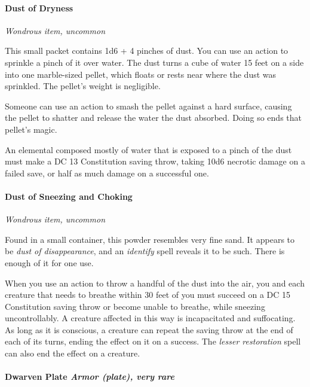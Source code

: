 \documentclass[
]{article}
\begin{document}
\hypertarget{dust-of-dryness}{%
\paragraph{Dust of Dryness}\label{dust-of-dryness}}

\emph{Wondrous item, uncommon}

This small packet contains 1d6 + 4 pinches of dust. You can use an
action to sprinkle a pinch of it over water. The dust turns a cube of
water 15 feet on a side into one marble-sized pellet, which floats or
rests near where the dust was sprinkled. The pellet's weight is
negligible.

Someone can use an action to smash the pellet against a hard surface,
causing the pellet to shatter and release the water the dust absorbed.
Doing so ends that pellet's magic.

An elemental composed mostly of water that is exposed to a pinch of the
dust must make a DC 13 Constitution saving throw, taking 10d6 necrotic
damage on a failed save, or half as much damage on a successful one.

\hypertarget{dust-of-sneezing-and-choking}{%
\paragraph{Dust of Sneezing and
Choking}\label{dust-of-sneezing-and-choking}}

\emph{Wondrous item, uncommon}

Found in a small container, this powder resembles very fine sand. It
appears to be \emph{dust of disappearance}, and an \emph{identify} spell
reveals it to be such. There is enough of it for one use.

When you use an action to throw a handful of the dust into the air, you
and each creature that needs to breathe within 30 feet of you must
succeed on a DC 15 Constitution saving throw or become unable to
breathe, while sneezing uncontrollably. A creature affected in this way
is incapacitated and suffocating. As long as it is conscious, a creature
can repeat the saving throw at the end of each of its turns, ending the
effect on it on a success. The \emph{lesser restoration} spell can also
end the effect on a creature.

\hypertarget{dwarven-plate-armor-plate-very-rare}{%
\paragraph{\texorpdfstring{Dwarven Plate \emph{Armor (plate), very
rare}}{Dwarven Plate Armor (plate), very rare}}\label{dwarven-plate-armor-plate-very-rare}}
\end{document}
